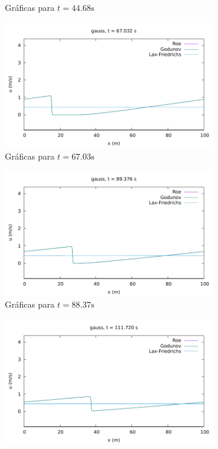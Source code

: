 \documentclass[12pt]{article}
\begin{document}
\begin{figure}[h!]
\begin{subfigure}{0.4\textwidth}
			\caption*{Gráficas para $t=44.68\unit{\second}$}
			\label{fig:gauss-perio3}
		\end{subfigure}\hfill
		\begin{subfigure}{0.4\textwidth}
			\centering
			\includegraphics[width=\textwidth]{../burgers1DVF/results/sol_periodicas/gauss/063.pdf}
			\caption*{Gráficas para $t=67.03\unit{\second}$}
			\label{fig:gauss-perio4}
		\end{subfigure}\par
		\begin{subfigure}{0.4\textwidth}
			\centering
			\includegraphics[width=\textwidth]{../burgers1DVF/results/sol_periodicas/gauss/084.pdf}
			\caption*{Gráficas para $t=88.37\unit{\second}$}
			\label{fig:gauss-perio5}
		\end{subfigure}\hfill
		\begin{subfigure}{0.4\textwidth}
			\centering
			\includegraphics[width=\textwidth]{../burgers1DVF/results/sol_periodicas/gauss/105.pdf}

\end{subfigure}
\end{figure}
\end{document}
